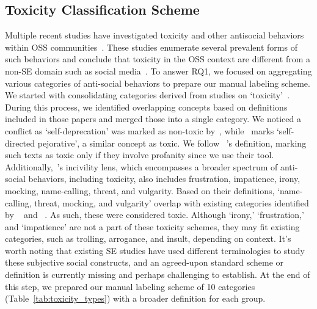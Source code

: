 \subsection{Toxicity Classification Scheme}
\label{sec:classification-scheme}
Multiple recent studies have investigated toxicity and other antisocial behaviors within OSS communities~\cite{sarker2022automated,miller2022did,rahman2024words,raman2020stress,ferreira2021shut,sultana2022identifying,gunawardena2022destructive,egelman2020predicting}. These studies enumerate several prevalent forms of such behaviors and conclude that toxicity in the OSS context are different from a non-SE domain such as social media~\cite{miller2022did}. To answer RQ1, we focused on aggregating various categories of anti-social behaviors to prepare our manual labeling scheme. We started with consolidating categories derived from studies on `toxicity'~\cite{raman2020stress,miller2022did,sarker2022automated,qiu2022detecting}. During this process, we identified overlapping concepts based on definitions included in those papers and merged those into a single category. We noticed a conflict as `self-deprecation' was marked as non-toxic by~\citet{sarker2022automated}, while~\citet{miller2022did} marks `self-directed pejorative', a similar concept as toxic. We follow ~\citet{sarker2022automated}'s definition, marking such texts as toxic only if they involve profanity since we use their tool.
Additionally,~\citet{ferreira2021shut}'s incivility lens, which encompasses a broader spectrum of anti-social behaviors, including toxicity, also includes frustration, impatience, irony, mocking, name-calling, threat, and vulgarity. Based on their definitions, `name-calling, threat, mocking, and vulgarity' overlap with existing categories identified by ~\citet{miller2022did} and ~\citet{sarker2022automated}. As such, these were considered toxic. Although `irony,' `frustration,' and `impatience' are not a part of these toxicity schemes, they may fit existing categories, such as trolling, arrogance, and insult, depending on context. It's worth noting that existing SE studies have used different terminologies to study these subjective social constructs, and an agreed-upon standard scheme or definition is currently missing and perhaps challenging to establish. 
At the end of this step, we prepared our manual labeling scheme of 10 categories (Table~\ref{tab:toxicity_types}) with a broader definition for each group.




